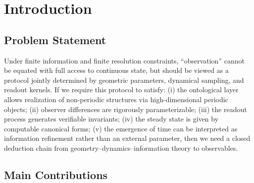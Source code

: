 \section{Introduction}

\subsection{Problem Statement}

Under finite information and finite resolution constraints, ``observation'' cannot be equated with full access to continuous state, but should be viewed as a protocol jointly determined by geometric parameters, dynamical sampling, and readout kernels. If we require this protocol to satisfy: (i) the ontological layer allows realization of non-periodic structures via high-dimensional periodic objects; (ii) observer differences are rigorously parameterizable; (iii) the readout process generates verifiable invariants; (iv) the steady state is given by computable canonical forms; (v) the emergence of time can be interpreted as information refinement rather than an external parameter, then we need a closed deduction chain from geometry--dynamics--information theory to observables.

\subsection{Main Contributions}

